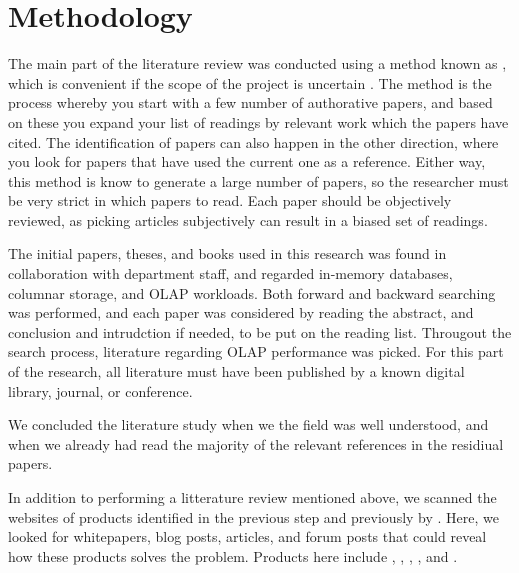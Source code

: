 \section{Methodology}
\label{sec:Methodology}

The main part of the literature review was conducted using a method known as , which is convenient if the scope of the project is uncertain \cite{Ang2014-nm}. The  method is the process whereby you start with a few number of authorative papers, and based on these you expand your list of readings by relevant work which the papers have cited. The identification of papers can also happen in the other direction, where you look for papers that have used the current one as a reference. Either way, this method is know to generate a large number of papers, so the researcher must be very strict in which papers to read. Each paper should be objectively reviewed, as picking articles subjectively can result in a biased set of readings.

The initial papers, theses, and books used in this research was found in collaboration with department staff, and regarded in-memory databases, columnar storage, and OLAP workloads. Both forward and backward searching was performed, and each paper was considered by reading the abstract, and conclusion and intrudction if needed, to be put on the reading list. Througout the search process, literature regarding OLAP performance was picked. For this part of the research, all literature must have been published by a known digital library, journal, or conference. 

We concluded the literature study when we the field was well understood, and when we already had read the majority of the relevant references in the residiual papers.

In addition to performing a  litterature review mentioned above, we scanned the websites of products identified in the previous step and previously by \genus. Here, we looked for whitepapers, blog posts, articles, and forum posts that could reveal how these products solves the problem. Products here include , , , , and .
